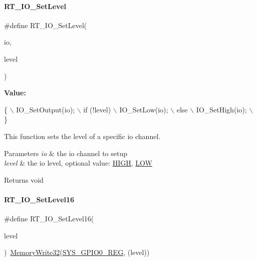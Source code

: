 \paragraph{\texorpdfstring{R\+T\+\_\+\+I\+O\+\_\+\+Set\+Level}{RT\_IO\_SetLevel}}
{\footnotesize\ttfamily \#define R\+T\+\_\+\+I\+O\+\_\+\+Set\+Level(\begin{DoxyParamCaption}\item[{}]{io,  }\item[{}]{level }\end{DoxyParamCaption})}

{\bfseries Value\+:}
\begin{DoxyCode}
\{                       \(\backslash\)
        IO\_SetOutput(io);   \(\backslash\)
        if (!level)         \(\backslash\)
            IO\_SetLow(io);  \(\backslash\)
        else                \(\backslash\)
            IO\_SetHigh(io); \(\backslash\)
    \}
\end{DoxyCode}


This function sets the level of a specific io channel. 


\begin{DoxyParams}{Parameters}
{\em io} & the io channel to setup \\
\hline
{\em level} & the io level, optional value\+: \mbox{\hyperlink{a00014_a5bb885982ff66a2e0a0a45a8ee9c35e2}{H\+I\+GH}}, \mbox{\hyperlink{a00014_ab811d8c6ff3a505312d3276590444289}{L\+OW}} \\
\hline
\end{DoxyParams}
\begin{DoxyReturn}{Returns}
void 
\end{DoxyReturn}
\mbox{\label{a00014_a5a3ae496ca3e12098c74c9f13b20c554}} 
\paragraph{\texorpdfstring{R\+T\+\_\+\+I\+O\+\_\+\+Set\+Level16}{RT\_IO\_SetLevel16}}
{\footnotesize\ttfamily \#define R\+T\+\_\+\+I\+O\+\_\+\+Set\+Level16(\begin{DoxyParamCaption}\item[{}]{level }\end{DoxyParamCaption})~\mbox{\hyperlink{a00020_a6b9732365b12e48ddb89fe1028b975b0}{Memory\+Write32}}(\mbox{\hyperlink{a00020_adadaa0ab1ebbd7ba9b70dfd24c3ed44dabc4ad11c216d218134b37833679bab11}{S\+Y\+S\+\_\+\+G\+P\+I\+O0\+\_\+\+R\+EG}}, (level))}



